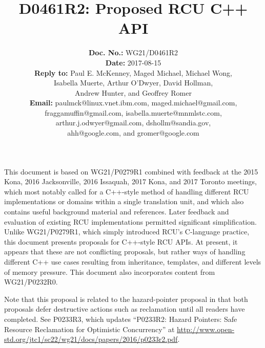 \documentclass[letterpaper,10pt]{article}
\begin{document}
\newcommand{\co}[1]{\lstinline[breaklines=yes,breakatwhitespace=yes]{#1}}

\title{D0461R2: Proposed RCU C++ API}

\author{
{\bf Doc. No.: } WG21/D0461R2 \\
{\bf Date: } 2017-08-15 \\
{\bf Reply to: } Paul E. McKenney, Maged Michael, Michael Wong,\\
Isabella Muerte, Arthur O'Dwyer, David Hollman, \\
Andrew Hunter, and Geoffrey Romer \\
{\bf Email: } paulmck@linux.vnet.ibm.com, maged.michael@gmail.com, \\
fraggamuffin@gmail.com, isabella.muerte@mnmlstc.com, \\
arthur.j.odwyer@gmail.com, dshollm@sandia.gov, \\
ahh@google.com, and gromer@google.com
} %


\pagestyle{myheadings}

\maketitle


This document is based on WG21/P0279R1 combined with feedback at
the 2015 Kona, 2016 Jacksonville, 2016 Issaquah, 2017 Kona, and
2017 Toronto meetings, which most notably called
for a C++-style method of handling different RCU implementations or
domains within a single translation unit, and which also contains
useful background material and references.
Later feedback and evaluation of existing RCU implementations permitted
significant simplification.
Unlike WG21/P0279R1, which simply introduced RCU's C-language practice,
this document presents proposals for C++-style RCU APIs.
At present, it appears that these are not conflicting proposals, but
rather ways of handling different C++ use cases resulting from
inheritance, templates, and different levels of memory pressure.
This document also incorporates content from
WG21/P0232R0\cite{PaulEMcKennneyToolKitP0232R0}.

Note that this proposal is related to the hazard-pointer proposal in
that both proposals defer destructive actions such as reclamation until
all readers have completed.
See P0233R3, which updates ``P0233R2: Hazard Pointers:
Safe Resource Reclamation for Optimistic Concurrency''
at \url{http://www.open-std.org/jtc1/sc22/wg21/docs/papers/2016/p0233r2.pdf}.
\end{document}
